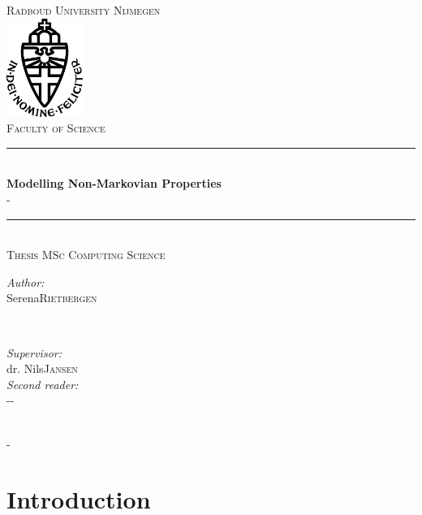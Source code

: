 \documentclass{report}
\title{\thesistitle}
\author{\thesisauthorfirst\space\thesisauthorsecond}
\date{\thesisdate}
\def\thesistitle{Modelling Non-Markovian Properties}
\def\thesissubtitle{-}
\def\thesisauthorfirst{Serena}
\def\thesisauthorsecond{Rietbergen}
\def\thesissupervisorfirst{dr. Nils}
\def\thesissupervisorsecond{Jansen}
\def\thesissecondreaderfirst{-}
\def\thesissecondreadersecond{-}
\def\thesisdate{-}
\theoremstyle{definition}
\theoremstyle{remark}
\begin{document}
	\begin{titlepage}
		\thispagestyle{empty}
		\newcommand{\HRule}{\rule{\linewidth}{0.5mm}}
		\center
		\textsc{\Large Radboud University Nijmegen}\\[.7cm]
		\includegraphics[width=25mm]{img/in_dei_nomine_feliciter.eps}\\[.5cm]
		\textsc{Faculty of Science}\\[0.5cm]
		
		\HRule \\[0.4cm]
		{ \huge \bfseries \thesistitle}\\[0.1cm]
		\textsc{\thesissubtitle}\\
		\HRule \\[.5cm]
		\textsc{\large Thesis MSc Computing Science}\\[.5cm]
		
		\begin{minipage}{0.4\textwidth}
			\begin{flushleft} \large
				\emph{Author:}\\
				\thesisauthorfirst\space \textsc{\thesisauthorsecond}
			\end{flushleft}
		\end{minipage}
		~
		\begin{minipage}{0.4\textwidth}
			\begin{flushright} \large
				\emph{Supervisor:} \\
				\thesissupervisorfirst\space \textsc{\thesissupervisorsecond} \\[1em]
				\emph{Second reader:} \\
				\thesissecondreaderfirst\space \textsc{\thesissecondreadersecond}
			\end{flushright}
		\end{minipage}\\[4cm]
		\vfill
		{\large \thesisdate}\\
		\clearpage
	\end{titlepage}
	
	\tableofcontents
	
	\newpage
	
	\chapter{Introduction}
	
\end{document}
